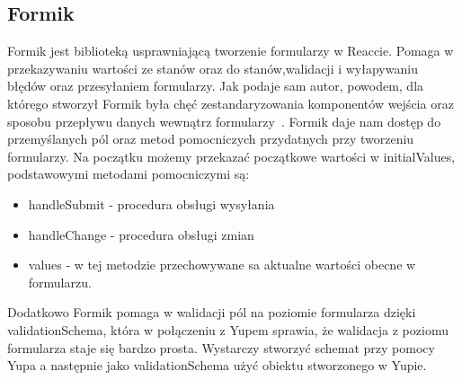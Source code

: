 \documentclass[oneside,polski,logo,indent]{amuthesis}
\begin{document}
\subsection{Formik}
Formik jest biblioteką usprawniającą tworzenie formularzy w Reaccie. Pomaga w przekazywaniu wartości ze stanów oraz do stanów,walidacji i wyłapywaniu błędów oraz przesyłaniem formularzy.
Jak podaje sam autor, powodem, dla którego stworzył Formik była chęć zestandaryzowania komponentów wejścia oraz sposobu przepływu danych wewnątrz formularzy~\cite{formik}.
\newline
Formik daje nam dostęp do przemyślanych pól oraz metod pomocniczych przydatnych przy tworzeniu formularzy. Na początku możemy przekazać
początkowe wartości w initialValues, podstawowymi metodami pomocniczymi są:
\begin{itemize}
\item handleSubmit - procedura obsługi wysyłania
\item handleChange - procedura obsługi zmian
\item values - w tej metodzie przechowywane sa aktualne wartości obecne w formularzu.
\end{itemize}
Dodatkowo Formik pomaga w walidacji pól na poziomie formularza dzięki validationSchema, która w połączeniu z Yupem sprawia, że walidacja z poziomu formularza staje się
bardzo prosta. Wystarczy stworzyć schemat przy pomocy Yupa a następnie jako validationSchema użyć obiektu stworzonego w Yupie.
\end{document}
